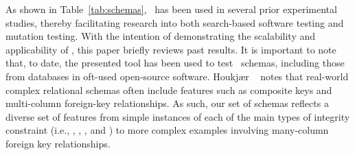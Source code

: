 


As shown in Table~\ref{tab:schemas}, \sa~has been used in several prior experimental studies, thereby facilitating
research into both search-based software testing and mutation testing. With the intention of demonstrating the
scalability and applicability of \sa, this paper briefly reviews past results. It is important to note that, to date,
the presented tool has been used to test \numtestedschemas~schemas, including those from databases in oft-used
open-source software. Houkj{\ae}r \etal~\cite{Houkjaer2006} notes that real-world complex relational schemas often
include features such as composite keys and multi-column foreign-key relationships. As such, our set of schemas reflects
a diverse set of features from simple instances of each of the main types of integrity constraint (i.e., \PKCs, \FKCs,
\UCs, \NNCs and \CCs) to more complex examples involving many-column foreign key relationships.

